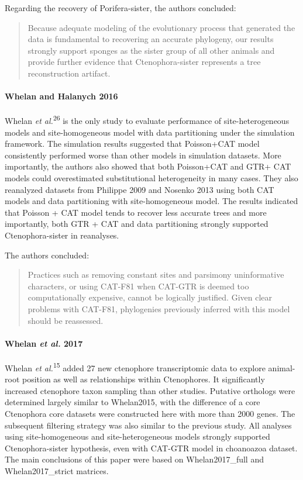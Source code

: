 \documentclass[]{article}
\let\oldparagraph\paragraph
\renewcommand{\paragraph}[1]{\oldparagraph{#1}\mbox{}}
\begin{document}
Regarding the recovery of Porifera-sister, the authors concluded:

\begin{quote}
Because adequate modeling of the evolutionary process that generated the
data is fundamental to recovering an accurate phylogeny, our results
strongly support sponges as the sister group of all other animals and
provide further evidence that Ctenophora-sister represents a tree
reconstruction artifact.
\end{quote}

\hypertarget{whelan-and-halanych-2016}{%
\paragraph{Whelan and Halanych 2016}\label{whelan-and-halanych-2016}}

Whelan \emph{et al.}\textsuperscript{26} is the only study to evaluate
performance of site-heterogeneous models and site-homogeneous model with
data partitioning under the simulation framework. The simulation results
suggested that Poisson+CAT model consistently performed worse than other
models in simulation datasets. More importantly, the authors also showed
that both Poisson+CAT and GTR+ CAT models could overestimated
substitutional heterogeneity in many cases. They also reanalyzed
datasets from Philippe 2009 and Nosenko 2013 using both CAT models and
data partitioning with site-homogeneous model. The results indicated
that Poisson + CAT model tends to recover less accurate trees and more
importantly, both GTR + CAT and data partitioning strongly supported
Ctenophora-sister in reanalyses.

The authors concluded:

\begin{quote}
Practices such as removing constant sites and parsimony uninformative
characters, or using CAT-F81 when CAT-GTR is deemed too computationally
expensive, cannot be logically justified. Given clear problems with
CAT-F81, phylogenies previously inferred with this model should be
reassessed.
\end{quote}

\hypertarget{whelan-et-al.-2017}{%
\paragraph{\texorpdfstring{Whelan \emph{et al.}
2017}{Whelan et al. 2017}}\label{whelan-et-al.-2017}}

Whelan \emph{et al.}\textsuperscript{15} added 27 new ctenophore
transcriptomic data to explore animal-root position as well as
relationships within Ctenophores. It significantly increased ctenophore
taxon sampling than other studies. Putative orthologs were determined
largely similar to Whelan2015, with the difference of a core Ctenophora
core datasets were constructed here with more than 2000 genes. The
subsequent filtering strategy was also similar to the previous study.
All analyses using site-homogeneous and site-heterogeneous models
strongly supported Ctenophora-sister hypothesis, even with CAT-GTR model
in choanoazoa dataset. The main conclusions of this paper were based on
Whelan2017\_full and Whelan2017\_strict matrices.
\end{document}
